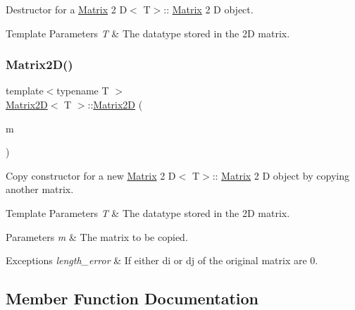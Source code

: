 Destructor for a \mbox{\hyperlink{classMatrix}{Matrix}} 2 D$<$ T$>$\+:\+: \mbox{\hyperlink{classMatrix}{Matrix}} 2 D object. 


\begin{DoxyTemplParams}{Template Parameters}
{\em T} & The datatype stored in the 2D matrix. \\
\hline
\end{DoxyTemplParams}
\mbox{\label{classMatrix2D_aa1d3642d7cea07adac1a7bd83586d292}} 
\subsubsection{\texorpdfstring{Matrix2\+D()}{Matrix2D()}\hspace{0.1cm}{\footnotesize\ttfamily [3/3]}}
{\footnotesize\ttfamily template$<$typename T $>$ \\
\mbox{\hyperlink{classMatrix2D}{Matrix2D}}$<$ T $>$\+::\mbox{\hyperlink{classMatrix2D}{Matrix2D}} (\begin{DoxyParamCaption}\item[{const \mbox{\hyperlink{classMatrix2D}{Matrix2D}}$<$ T $>$ \&}]{m }\end{DoxyParamCaption})}



Copy constructor for a new \mbox{\hyperlink{classMatrix}{Matrix}} 2 D$<$ T$>$\+:\+: \mbox{\hyperlink{classMatrix}{Matrix}} 2 D object by copying another matrix. 


\begin{DoxyTemplParams}{Template Parameters}
{\em T} & The datatype stored in the 2D matrix. \\
\hline
\end{DoxyTemplParams}

\begin{DoxyParams}{Parameters}
{\em m} & The matrix to be copied.\\
\hline
\end{DoxyParams}

\begin{DoxyExceptions}{Exceptions}
{\em length\+\_\+error} & If either di or dj of the original matrix are 0. \\
\hline
\end{DoxyExceptions}


\subsection{Member Function Documentation}
\mbox{\label{classMatrix2D_a2bd34bc1808af36aa3dce5af143ce304}} 
